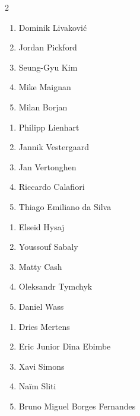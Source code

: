 \documentclass[11pt]{article}
\begin{document}
\begin{multicols}{2}

\begin{samepage}
\begin{tcolorbox}[evalbox,title=\textbf{Manuel Neuer (Goalkeeper)} \hfill Score:\ \rule{1cm}{0.4pt}]
\begin{enumerate}
\item Dominik Livaković
\item Jordan Pickford
\item Seung-Gyu Kim
\item Mike Maignan
\item Milan Borjan
\end{enumerate}
\end{tcolorbox}
\end{samepage}

\begin{samepage}
\begin{tcolorbox}[evalbox,title=\textbf{Virgil van Dijk (Left Center Back)} \hfill Score:\ \rule{1cm}{0.4pt}]
\begin{enumerate}
\item Philipp Lienhart
\item Jannik Vestergaard
\item Jan Vertonghen
\item Riccardo Calafiori
\item Thiago Emiliano da Silva
\end{enumerate}
\end{tcolorbox}
\end{samepage}

\begin{samepage}
\begin{tcolorbox}[evalbox,title=\textbf{Trent Alexander-Arnold (Right Defensive Midfield)} \hfill Score:\ \rule{1cm}{0.4pt}]
\begin{enumerate}
\item Elseid Hysaj
\item Youssouf Sabaly
\item Matty Cash
\item Oleksandr Tymchyk
\item Daniel Wass
\end{enumerate}
\end{tcolorbox}
\end{samepage}

\begin{samepage}
\begin{tcolorbox}[evalbox,title=\textbf{Kevin De Bruyne (Center Attacking Midfield)} \hfill Score:\ \rule{1cm}{0.4pt}]
\begin{enumerate}
\item Dries Mertens
\item Eric Junior Dina Ebimbe
\item Xavi Simons
\item Naïm Sliti
\item Bruno Miguel Borges Fernandes
\end{enumerate}
\end{tcolorbox}
\end{samepage}


\end{multicols}
\end{document}
